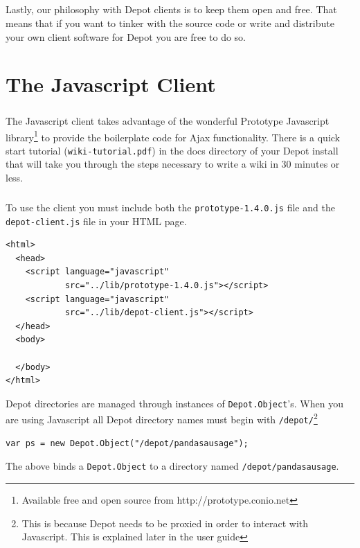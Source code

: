 \documentclass{report}
\begin{document}
\paragraph{}
Lastly, our philosophy with Depot clients is to keep them open and
free. That means that if you want to tinker with the source code or
write and distribute your own client software for Depot you are free
to do so.

\chapter{The Javascript Client}


\paragraph{}
The Javascript client takes advantage of the wonderful Prototype
Javascript library\footnote{Available free and open source from
  http://prototype.conio.net} to provide the boilerplate code for Ajax
functionality. There is a quick start tutorial
(\texttt{wiki-tutorial.pdf}) in the docs directory of your Depot
install that will take you through the steps necessary to write a wiki
in 30 minutes or less.
\paragraph{}
To use the client you must include both the
\texttt{prototype-1.4.0.js} file and the \texttt{depot-client.js} file
in your HTML page.
\begin{Verbatim}[frame=single]
<html>
  <head>
    <script language="javascript" 
            src="../lib/prototype-1.4.0.js"></script>
    <script language="javascript" 
            src="../lib/depot-client.js"></script>
  </head>
  <body>

  </body>
</html>
\end{Verbatim}

Depot directories are managed through instances of
\texttt{Depot.Object}'s. When you are using Javascript all Depot
directory names must begin with \texttt{/depot/}\footnote{This is
  because Depot needs to be proxied in order to interact with
  Javascript. This is explained later in the user guide}

\begin{Verbatim}[frame=single]
 var ps = new Depot.Object("/depot/pandasausage");
\end{Verbatim}

The above binds a \texttt{Depot.Object} to a directory named
\texttt{/depot/pandasausage}. 
\end{document}
